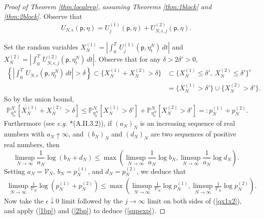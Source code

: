 \documentclass[11pt]{amsart}
\theoremstyle{plain}
\theoremstyle{definition}
\theoremstyle{remark}
\newcommand{\pt}{\mathsf{p}}
\newcommand{\Uone}[1]{U^{(1)}_{{#1}}}
\newcommand{\Utwo}[3]{U^{(2)}_{{#1},{#2},{#3}}}
\begin{document}
\begin{proof}[Proof of Theorem \ref{thm:localrep}, assuming Theorems \ref{thm:1block} and \ref{thm:2block}]
Observe that
\begin{align}
\label{UDecomp} U_{N,\epsilon}(\pt,\eta)= \Uone{j}(\pt,\eta) + \Utwo{N}{\epsilon}{j}(\pt,\eta).
\end{align}

Set the random variables $X^{(1)}_N = \left|\int_0^T \, \Uone{j}(\pt,\eta^N_t)\,dt\right|$ and $X^{(2)}_N = \left|\int_0^T \, \Utwo{N}{\epsilon}{j}(\pt,\eta^N_t)\,dt\right|$. Observe that for any $\delta>2\delta'>0$,
\begin{align*}
\left\{\left|\int_0^T\, U_{N,\epsilon}(\pt, \eta^N_t)\,dt\right|>\delta\right\}  \subset \{X^{(1)}_N+X^{(2)}_N > \delta\} &\subset \{X^{(1)}_N \leq \delta',~X^{(2)}_N \leq \delta'\}^c \\
& = \{X^{(1)}_N>\delta'\} \cup \{X^{(2)}_N>\delta'\}.
\end{align*}
So by the union bound,
\begin{align*}
\mathbb{P}^N_{\eta_0^N}\left[X^{(1)}_N+X^{(2)}_N>\delta\right] \leq \mathbb{P}^N_{\eta_0^N}\left[X^{(1)}_N>\delta'\right] + \mathbb{P}^N_{\eta_0^N}\left[X^{(2)}_N>\delta'\right] =: p^{(1)}_N + p^{(2)}_N.
\end{align*}
Furthermore (see \emph{e.g.\@} \cite{KipnisLandim}*{(A.II.3.2)}), if $(a_N)_N$ is an increasing sequence of real numbers with $a_N \uparrow \infty$, and $(b_N)_N$ and $(d_N)_N$ are two sequences of positive real numbers, then
\begin{equation}
\label{px1x2}
\limsup_{N\to\infty} \frac{1}{a_N} \log(b_N + d_N) \leq \max \left(\limsup_{N\to\infty} \frac{1}{a_N}\log b_N, \limsup_{N\to\infty} \frac{1}{a_N} \log d_N\right).
\end{equation}
Setting $a_N=\mathcal{V}_N$, $b_N=p^{(1)}_N$, and $d_N=p^{(2)}_N$, we deduce that
\begin{align}
\label{qx1x2}
\limsup_{N\to\infty} \frac{1}{\mathcal{V}_N}\log\left(p^{(1)}_N + p^{(2)}_N\right) \leq \max\left(\limsup_{N\to\infty}\frac{1}{\mathcal{V}_N} \log p^{(1)}_N , \limsup_{N\to\infty} \frac{1}{\mathcal{V}_N}\log p^{(2)}_N \right).
\end{align}
Now take the $\epsilon\downarrow 0$ limit followed by the $j\to\infty$ limit on both sides of (\ref{qx1x2}), and apply (\ref{1bp}) and (\ref{2bp}) to deduce (\ref{supexp}).
\end{proof}
\end{document}
